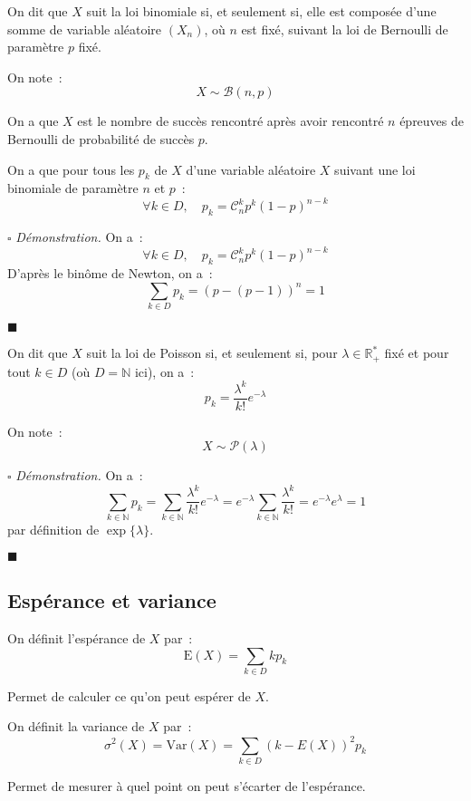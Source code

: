 \documentclass[a4paper, titlepage]{article}
\renewenvironment{proof}{$\square$ \footnotesize\textit{Démonstration.}}{\begin{flushright}$\blacksquare$\end{flushright}}
\begin{document}
	\begin{defn}
		On dit que $X$ suit la loi binomiale si, et seulement si, elle est composée d'une somme de variable aléatoire $(X_n)$, où $n$ est fixé, suivant la loi de Bernoulli de paramètre $p$ fixé.

		On note~:
		$$ X\sim\mathcal{B}(n,p) $$
	\end{defn}
	On a que $X$ est le nombre de succès rencontré après avoir rencontré $n$ épreuves de Bernoulli de probabilité de succès $p$.

	\begin{props}
		On a que pour tous les $p_k$ de $X$ d'une variable aléatoire $X$ suivant une loi binomiale de paramètre $n$ et $p$~:
		$$ \forall k\in D,\quad p_k = \mathcal{C}^k_n p^k(1-p)^{n-k} $$
	\end{props}
	\begin{proof}
		On a~:
		$$ \forall k\in D,\quad p_k = \mathcal{C}^k_n p^k(1-p)^{n-k} $$
		D'après le binôme de Newton, on a~:
		$$ \sum_{k\in D} p_k = (p-(p-1))^{n} = 1 $$
	\end{proof}

	\begin{defn}
		On dit que $X$ suit la loi de Poisson si, et seulement si, pour $\lambda\in\mathbb{R}^*_+$ fixé et pour tout $k\in D$ (où $D=\mathbb{N}$ ici), on a~:
		$$ p_k = \frac{\lambda^k}{k!}e^{-\lambda} $$

		On note~:
		$$ X\sim\mathcal{P}(\lambda) $$
	\end{defn}
	\begin{proof}
		On a~:
		$$ \sum_{k\in\mathbb{N}} p_k = \sum_{k\in\mathbb{N}} \frac{\lambda^k}{k!}e^{-\lambda} = e^{-\lambda}\sum_{k\in\mathbb{N}} \frac{\lambda^k}{k!} = e^{-\lambda}e^{\lambda} = 1 $$
		par définition de $\exp\{\lambda\}$.
	\end{proof}
	
	\subsection{Espérance et variance}
	\begin{defn}[Espérance]
		On définit l'espérance de $X$ par~:
		$$ \mathrm{E}(X) = \sum_{k\in D} kp_k $$
	\end{defn}
	Permet de calculer ce qu'on peut espérer de $X$.

	\begin{defn}[Variance]
		On définit la variance de $X$ par~:
		$$ \sigma^2(X) = \mathrm{Var}(X) = \sum_{k\in D} (k-E(X))^2p_k $$
	\end{defn}
	Permet de mesurer à quel point on peut s'écarter de l'espérance.
\end{document}
